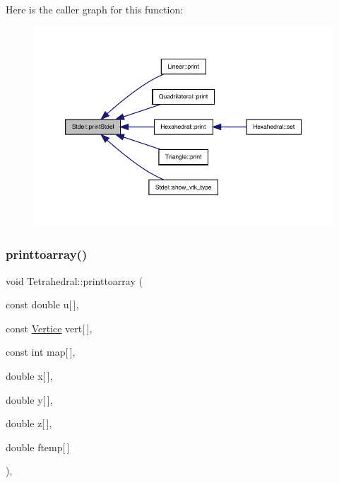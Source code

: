 Here is the caller graph for this function\+:
\nopagebreak
\begin{figure}[H]
\begin{center}
\leavevmode
\includegraphics[width=350pt]{classStdel_a54b5768d09f500cb949e66fc234eac70_icgraph}
\end{center}
\end{figure}
\mbox{\label{classTetrahedral_a6d77895bb1de878cf21430c3ad6ee5fc}} 
\subsubsection{\texorpdfstring{printtoarray()}{printtoarray()}}
{\footnotesize\ttfamily void Tetrahedral\+::printtoarray (\begin{DoxyParamCaption}\item[{const double}]{u\mbox{[}$\,$\mbox{]},  }\item[{const \hyperlink{structVertice}{Vertice}}]{vert\mbox{[}$\,$\mbox{]},  }\item[{const int}]{map\mbox{[}$\,$\mbox{]},  }\item[{double}]{x\mbox{[}$\,$\mbox{]},  }\item[{double}]{y\mbox{[}$\,$\mbox{]},  }\item[{double}]{z\mbox{[}$\,$\mbox{]},  }\item[{double}]{ftemp\mbox{[}$\,$\mbox{]} }\end{DoxyParamCaption})\hspace{0.3cm}{\ttfamily [private]}, {\ttfamily [virtual]}}



